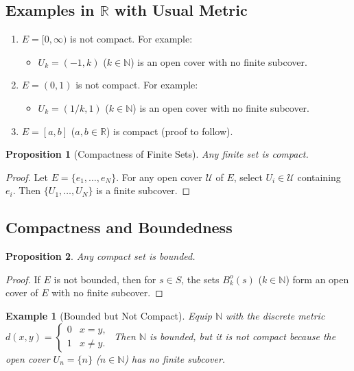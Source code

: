 \documentclass[9pt]{article}
\theoremstyle{definition}
\theoremstyle{plain}
\newtheorem{proposition}{Proposition}
\newtheorem{example}{Example}
\begin{document}
\subsection*{Examples in \( \mathbb{R} \) with Usual Metric}
\begin{enumerate}
    \item \( E = [0, \infty) \) is not compact. For example:
    \begin{itemize}
        \item \( U_k = (-1, k) \) (\( k \in \mathbb{N} \)) is an open cover with no finite subcover.
    \end{itemize}
    \item \( E = (0, 1) \) is not compact. For example:
    \begin{itemize}
        \item \( U_k = (1/k, 1) \) (\( k \in \mathbb{N} \)) is an open cover with no finite subcover.
    \end{itemize}
    \item \( E = [a, b] \) (\( a, b \in \mathbb{R} \)) is compact (proof to follow).
\end{enumerate}

\begin{proposition}[Compactness of Finite Sets]
Any finite set is compact.
\end{proposition}
\begin{proof}
Let \( E = \{e_1, \ldots, e_N\} \). For any open cover \( \mathcal{U} \) of \( E \), select \( U_i \in \mathcal{U} \) containing \( e_i \). Then \( \{U_1, \ldots, U_N\} \) is a finite subcover.
\end{proof}

\subsection*{Compactness and Boundedness}
\begin{proposition}
Any compact set is bounded.
\end{proposition}
\begin{proof}
If \( E \) is not bounded, then for \( s \in S \), the sets \( B_k^o(s) \) (\( k \in \mathbb{N} \)) form an open cover of \( E \) with no finite subcover.
\end{proof}

\begin{example}[Bounded but Not Compact]
Equip \( \mathbb{N} \) with the discrete metric \( d(x, y) = 
\begin{cases} 
0 & x = y, \\
1 & x \neq y.
\end{cases} \)
Then \( \mathbb{N} \) is bounded, but it is not compact because the open cover \( U_n = \{n\} \) (\( n \in \mathbb{N} \)) has no finite subcover.
\end{example}
\end{document}

